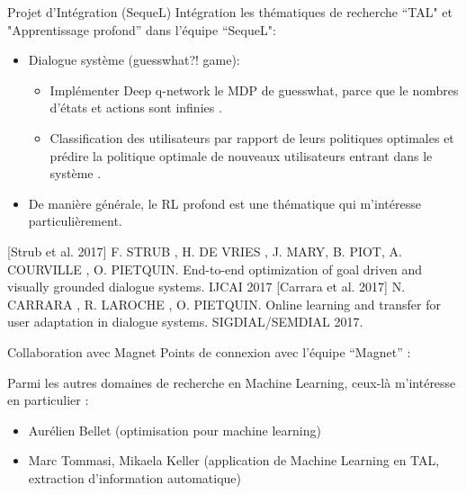 \begin{frame}{Projet d'Intégration (SequeL)}
Intégration les thématiques de recherche ``TAL" et "Apprentissage profond” dans l'équipe ``SequeL":
\begin{block}{}
	\begin{itemize}
		\item Dialogue système (guesswhat?! game):
			\begin{itemize}
				\item Implémenter Deep q-network le MDP de guesswhat, parce que le nombres d'états et actions sont infinies \cite{strub}.
				\item Classification des utilisateurs par rapport de leurs politiques optimales et prédire la politique optimale de nouveaux utilisateurs entrant dans le système \cite{carrara}.  
			\end{itemize}
		\item De manière générale, le RL profond est une thématique qui m'intéresse particulièrement. 
	\end{itemize}
\end{block}

[Strub et al. 2017] F. STRUB , H. DE VRIES , J. MARY, B. PIOT, A. COURVILLE , O.
PIETQUIN. End-to-end optimization of goal driven and visually grounded dialogue
systems. IJCAI 2017
\vspace{0.2cm}
[Carrara et al. 2017] N. CARRARA , R. LAROCHE , O. PIETQUIN. Online learning and transfer for user adaptation in dialogue systems. SIGDIAL/SEMDIAL 2017.

\end{frame}

\begin{frame}{Collaboration avec Magnet}
Points de connexion avec l’équipe ``Magnet” :

\vspace{0.5cm}

Parmi les autres domaines de recherche en Machine Learning, ceux-là m'intéresse en particulier :

\begin{block}{}
\begin{itemize}
	\item Aurélien Bellet (optimisation pour machine learning)
	\item Marc Tommasi, Mikaela Keller (application de Machine Learning en TAL, extraction d'information automatique)
\end{itemize}
\end{block}

\end{frame}
